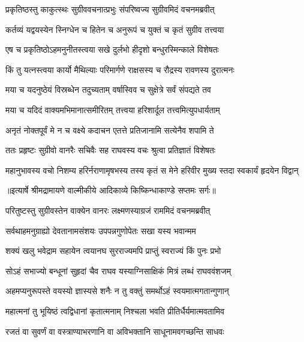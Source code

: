 \twolineshloka
{प्रकृतिष्ठस्तु काकुत्स्थः सुग्रीववचनात्प्रभुः}
{संपरिष्वज्य सुग्रीवमिदं वचनमब्रवीत्} %

\twolineshloka
{कर्तव्यं यद्वयस्येन स्निग्धेन च हितेन च}
{अनुरूपं च युक्तं च कृतं सुग्रीव तत्त्वया} %

\twolineshloka
{एष च प्रकृतिष्ठोऽहमनुनीतस्त्वया सखे}
{दुर्लभो हीदृशो बन्धुरस्मिन्काले विशेषतः} %

\twolineshloka
{किं तु यत्नस्त्वया कार्यो मैथिल्याः परिमार्गणे}
{राक्षसस्य च रौद्रस्य रावणस्य दुरात्मनः} %

\twolineshloka
{मया च यदनुष्ठेयं विस्रब्धेन तदुच्यताम्}
{वर्षास्विव च सुक्षेत्रे सर्वं संपद्यते तव} %

\twolineshloka
{मया च यदिदं वाक्यमभिमानात्समीरितम्}
{तत्त्वया हरिशार्दूल तत्त्वमित्युपधार्यताम्} %

\twolineshloka
{अनृतं नोक्तपूर्वं मे न च वक्ष्ये कदाचन}
{एतत्ते प्रतिजानामि सत्येनैव शपामि ते} %

\twolineshloka
{ततः प्रहृष्टः सुग्रीवो वानरैः सचिवैः सह}
{राघवस्य वचः श्रुत्वा प्रतिज्ञातं विशेषतः} %

\fourlineindentedshloka
{महानुभावस्य वचो निशम्य}
{ हरिर्नराणामृषभस्य तस्य}
{कृतं स मेने हरिवीर मुख्य}
{स्तदा स्वकार्यं हृदयेन विद्वान्} %


{॥इत्यार्षे श्रीमद्रामायणे वाल्मीकीये आदिकाव्ये किष्किन्धाकाण्डे सप्तमः सर्गः॥}


\twolineshloka
{परितुष्टस्तु सुग्रीवस्तेन वाक्येन वानरः}
{लक्ष्मणस्याग्रजं राममिदं वचनमब्रवीत्} %

\twolineshloka
{सर्वथाहमनुग्राह्यो देवतानामसंशयः}
{उपपन्नगुणोपेतः सखा यस्य भवान्मम} %

\twolineshloka
{शक्यं खलु भवेद्राम सहायेन त्वयानघ}
{सुरराज्यमपि प्राप्तुं स्वराज्यं किं पुनः प्रभो} %

\twolineshloka
{सोऽहं सभाज्यो बन्धूनां सुहृदां चैव राघव}
{यस्याग्निसाक्षिकं मित्रं लब्धं राघववंशजम्} %

\twolineshloka
{अहमप्यनुरूपस्ते वयस्यो ज्ञास्यसे शनैः}
{न तु वक्तुं समर्थोऽहं स्वयमात्मगतान्गुणान्} %

\twolineshloka
{महात्मनां तु भूयिष्ठं त्वद्विधानां कृतात्मनाम्}
{निश्चला भवति प्रीतिर्धैर्यमात्मवतामिव} %

\twolineshloka
{रजतं वा सुवर्णं वा वस्त्राण्याभरणानि वा}
{अविभक्तानि साधूनामवगच्छन्ति साधवः} %

